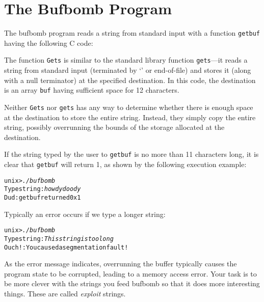 \documentclass[11pt]{article}
\newenvironment{ccode}%
{\small}%
{}
\newenvironment{tty}%
{\small\begin{alltt}}%
{\end{alltt}}
\begin{document}
\section*{The {\sc Bufbomb} Program}

The {\sc bufbomb} program reads a string from standard input with a
function {\tt getbuf} having the following C code:

\begin{ccode}

\end{ccode}

The function {\tt Gets} is similar to the standard library function
{\tt gets}---it reads a string from standard input (terminated by
`\verb@\n@' or end-of-file) and stores it (along with a null
terminator) at the specified destination.  In this code, the
destination is an array {\tt buf} having sufficient space for 12
characters.

Neither {\tt Gets} nor {\tt gets} has any way to determine whether
there is enough space at the destination to store the entire string.
Instead, they simply copy the entire string, possibly overrunning the
bounds of the storage allocated at the destination.

If the string typed by the user to {\tt getbuf} is no more than 11
characters long, it is clear that {\tt getbuf} will return 1, as shown
by the following execution example:

\begin{tty}
unix>{\em ./bufbomb}
Type string:{\em howdy doody}
Dud: getbuf returned 0x1
\end{tty}

Typically an error occurs if we type a longer string:

\begin{tty}
unix>{\em ./bufbomb}
Type string:{\em This string is too long}
Ouch!: You caused a segmentation fault!
\end{tty}

As the error message indicates, overrunning the buffer typically
causes the program state to be corrupted, leading to a memory access
error.  Your task is to be more clever with the strings you feed {\sc
bufbomb} so that it does more interesting things.  These are called
{\em exploit} strings.
\end{document}
